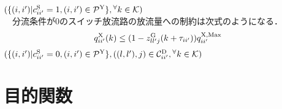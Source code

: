 \begin{itemize}
		\hspace{6.3cm}
			$ ( \{ ( i , i' ) | c_{ii'}^{\rm S} =1 , ( i , i' ) \in \mathcal {P}^{\rm Y}\} %
			, {}^{\forall} k \in \mathcal {K}) $ \\
%		
		　分流条件が0のスイッチ放流路の放流量への制約は次式のようになる．
%		
		\begin{equation}
			q^{\rm X}_{ii'} (k) \leq ( 1 - z^{\rm G}_{ll'j} (k + \tau_{ii'}) ) q_{ii'}^{\rm X,Max}
		\end{equation}
%
		\hspace{3.6cm}
		$ ( \{ ( i , i' ) | c_{ii'}^{\rm S} = 0 , ( i , i' ) \in \mathcal {P}^{\rm Y} \} %
		 , (( l , l' ) , j ) \in \mathcal C_{ii'}^{\rm D} , {}^{\forall} k \in \mathcal {K}) $		

%
%
%
%
%		
	\end{itemize}
	
\section{目的関数}

